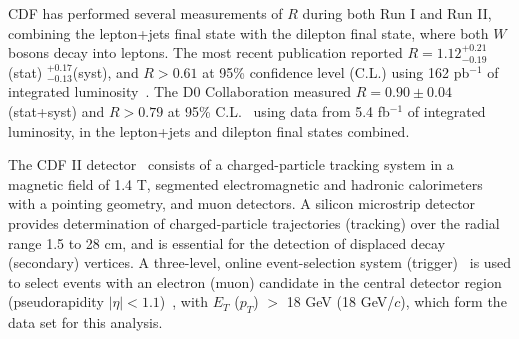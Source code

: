 \documentclass[aps,prd,twocolumn,superscriptaddress,showpacs]{revtex4}
\begin{document}
CDF has performed several
measurements of $R$ during both Run I and Run II, combining the lepton+jets
final state  with the dilepton final state, where both $W$ bosons decay into leptons. The most recent 
publication reported
$R=1.12^{+0.21}_{-0.19}$(stat) $^{+0.17}_{-0.13}$(syst), and $R>0.61$ at 95\% confidence level (C.L.) using
162 pb$^{-1}$ of integrated luminosity~\cite{R2005}.  The D0
Collaboration  measured  $R=0.90\pm0.04$ (stat+syst) and
$R>0.79$ at 95\% C.L.~\cite{d0meas} using data from 5.4 fb$^{-1}$ of integrated luminosity, 
in the lepton+jets and dilepton final states combined.  

The CDF II detector~\cite{CDFII} consists of a charged-particle
tracking system in a magnetic field of 1.4 T, segmented electromagnetic and hadronic calorimeters with a  pointing geometry, 
and muon detectors. A silicon microstrip detector provides determination of charged-particle trajectories 
(tracking) over the radial range 1.5 to 28 cm, and is essential
for the detection of displaced decay (secondary) vertices. 
A three-level, online event-selection system (trigger)~\cite{trigger} is used to select events with an 
electron (muon)  candidate in the central detector region
(pseudorapidity $| \eta | < 1.1 $)~\cite{coord}, 
with  $E_T$ ($p_{T}$) $>$ 18 GeV (18 GeV/$c$), 
which form the data set for this analysis. 
\end{document}
